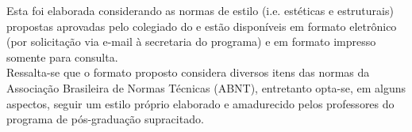 
\begin{notaestilo}
Esta \thetypeworkthree foi elaborada considerando as normas de
estilo (i.e. est\'eticas e estruturais) propostas aprovadas pelo
colegiado do \thefacultytwo e est\~ao dispon\'iveis em formato
eletr\^onico (por solicita\c{c}\~ao via e-mail \`a secretaria do
programa) e em formato impresso somente para consulta. \\

Ressalta-se que o formato proposto considera diversos itens das
normas da Associa\c{c}\~ao Brasileira de Normas T\'ecnicas (ABNT),
entretanto opta-se, em alguns aspectos, seguir um estilo pr\'oprio
elaborado e amadurecido pelos professores do programa de
p\'os-gradua\c{c}\~ao supracitado.

\end{notaestilo}
